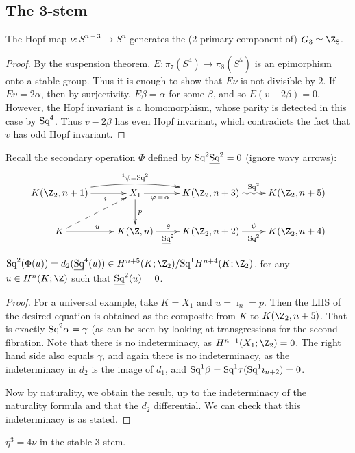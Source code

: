 \documentclass[11pt]{article}
\begin{document}
\subsection{The 3-stem}
\begin{prop*}[4]
The Hopf map $\nu:S^{n+3}\to S^n$ generates the (2-primary component of)
$G_3\simeq\Z_8$.
\end{prop*}
\begin{proof}
By the suspension theorem, $E:\pi_7(S^4)\to\pi_8(S^5)$ is an epimorphism onto a
stable group. Thus it is enough to show that $E\nu$ is not divisible by $2$. If
$Ev=2\alpha$, then by surjectivity, $E\beta=\alpha$ for some $\beta$, and so
$E(v-2\beta)=0$. However, the Hopf invariant is a homomorphism, whose parity is
detected in this case by $\textup{Sq}^4$. Thus $v-2\beta$ has even Hopf invariant,
which contradicts the fact that $v$ has odd Hopf invariant.
\end{proof}
Recall the secondary operation $\Phi$ defined by $\textup{Sq}^2\underline{\textup{Sq}}^2=0$ 
(ignore wavy arrows):
\[\xymatrix{
K(\Z_2,n+1)\ar[r]_{\ \ \ \ \ i}\ar@/^.8pc/[rr]^{^1\psi=\Squ^2}&
X_1\ar[r]_{\phi\,=\,\alpha\ \ \ \ \ \ \ \ }\ar[d]^p&
K(\Z_2,n+3)\ar@{~>}[r]^{\Squ^2}&K(\Z_2,n+5)\\
K\ar[r]^u\ar@{-->}[ru]&K(\Z,n)
\ar[r]^{\theta\ \ \ }_{\underline{\Squ}^2\ \ \ }&
K(\Z_2,n+2)\ar[r]^{\psi}_{\Squ^2}&
K(\Z_2,n+4)
}\]
\begin{lem*}[1]
$\Squ^2(\Phi(u))=d_2(\underline{\Squ}^4(u))
\in H^{n+5}(K;\Z_2)/\Squ^1H^{n+4}(K;\Z_2)$, for
any $u\in H^{n}(K;\Z)$ such that $\underline{\textup{Sq}}^2(u)=0$.
\end{lem*}
\begin{proof}
For a universal example, take $K=X_1$ and $u=\imath_n=p$. Then the LHS of the
desired equation is obtained as the composite from $K$ to $K(\Z_2,n+5)$. That is
exactly $\textup{Sq}^2\alpha=\gamma$ (as can be seen by looking at transgressions for
the second fibration. Note that there is no indeterminacy, as
$H^{n+1}(X_1;\Z_2)=0$. The right hand side also equals $\gamma$, and again there
is no indeterminacy, as the indeterminacy in $d_2$ is the image of $d_1$, and
$\textup{Sq}^1\beta=\textup{Sq}^1\tau(\textup{Sq}^1\imath_{n+2})=0$.

Now by naturality, we obtain the result, up to the indeterminacy of the
naturality formula and that the $d_2$ differential. We can check that this
indeterminacy is as stated.
\end{proof}
\begin{prop*}[5]
$\eta^3=4\nu$ in the stable 3-stem.
\end{prop*}
\end{document}
